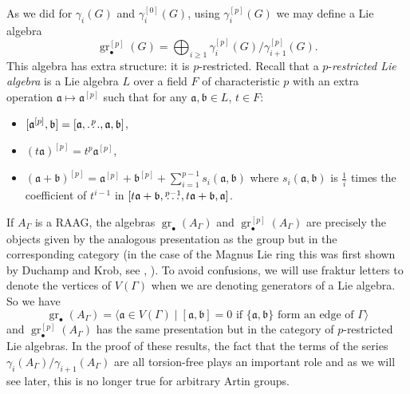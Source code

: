 \documentclass[10pt, oneside]{amsart}
\newcommand{\gr}{\operatorname{gr}} %
\theoremstyle{definition}
\theoremstyle{remark}
\theoremstyle{plain}
\begin{document}
As we did for $\gamma_i(G)$ and  $\gamma_i^{[0]}(G)$, using $\gamma_i^{[p]}(G)$ we may define a Lie algebra
$$\gr^{[p]}_\bullet(G)=\bigoplus_{i\geq 1}\gamma^{[p]}_i(G)/\gamma^{[p]}_{i+1}(G).$$
This algebra has extra structure: it is $p$-restricted. Recall that a $p$-{\sl restricted Lie algebra} is a Lie algebra $L$ over a field $F$ of characteristic $p$ with an extra operation $\mathfrak{a}\mapsto\mathfrak{a}^{[p]}$ such that for any $\mathfrak{a},\mathfrak{b}\in L$, $t\in F$:
\begin{itemize}
\item[i)] $[\mathfrak{a}^{[p]},\mathfrak{b}]=[\mathfrak{a},\buildrel{p}\over\ldots,\mathfrak{a},\mathfrak{b}]$,

\item[ii)] $(t\mathfrak{a})^{[p]}=t^p\mathfrak{a}^{[p]}$,

\item[iii)] $(\mathfrak{a}+\mathfrak{b})^{[p]}=\mathfrak{a}^{[p]}+\mathfrak{b}^{[p]}+\sum\limits_{i=1}^{p-1}s_i(\mathfrak{a},\mathfrak{b})$ where $s_i(\mathfrak{a},\mathfrak{b})$ is $\frac{1}{i}$ times the coefficient of $t^{i-1}$ in $[t\mathfrak{a}+\mathfrak{b},\buildrel{p-1}\over\ldots,t\mathfrak{a}+\mathfrak{b},\mathfrak{a}]$.
\end{itemize}


If $A_\Gamma$ is a RAAG, the algebras $\gr_\bullet(A_\Gamma)$ and $\gr^{[p]}_\bullet(A_\Gamma)$ are precisely the objects given by the analogous presentation as the group but in the corresponding category (in the case of the Magnus Lie ring this was first shown by Duchamp and Krob, see \cite{DuchampKrob}, \cite{BHS}). To avoid confusions, we will use fraktur letters to denote the vertices of $V(\Gamma)$ when we are denoting generators of a Lie algebra. So we have
$$\gr_\bullet(A_\Gamma)=\langle \mathfrak{a}\in V(\Gamma)\mid [\mathfrak{a},\mathfrak{b}]=0\text{ if }\{\mathfrak{a},\mathfrak{b}\}\text{ form an edge of }\Gamma\rangle$$
and $\gr^{[p]}_\bullet(A_\Gamma)$ has the same presentation but in the category of $p$-restricted Lie algebras. In the proof of these results, the fact that the terms of the series $\gamma_i(A_\Gamma)/\gamma_{i+1}(A_\Gamma)$ are all torsion-free plays an important role and as we will see later, this is no longer true for arbitrary Artin groups.
\end{document}

